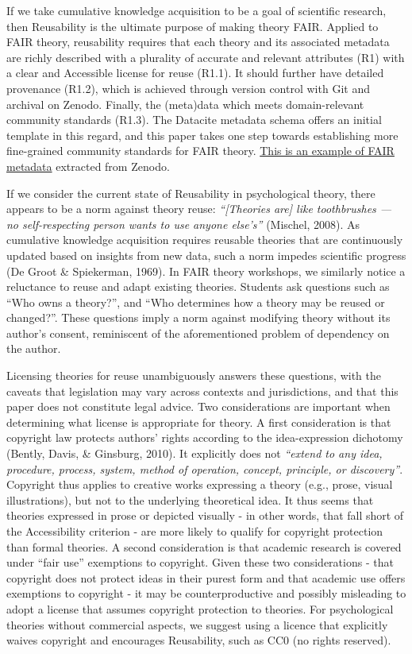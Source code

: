 \documentclass[
  man, noextraspace,floatsintext]{apa6}
\begin{document}
If we take cumulative knowledge acquisition to be a goal of scientific research, then Reusability is the ultimate purpose of making theory FAIR.
Applied to FAIR theory, reusability requires that each theory and its associated metadata are richly described with a plurality of accurate and relevant attributes (R1) with a clear and Accessible license for reuse (R1.1).
It should further have detailed provenance (R1.2),
which is achieved through version control with Git and archival on Zenodo.
Finally, the (meta)data which meets domain-relevant community standards (R1.3).
The Datacite metadata schema offers an initial template in this regard,
and this paper takes one step towards establishing more fine-grained community standards for FAIR theory.
\href{https://raw.githubusercontent.com/cjvanlissa/fair_theory/refs/heads/main/example_metadata.json}{This is an example of FAIR metadata} extracted from Zenodo.

If we consider the current state of Reusability in psychological theory, there appears to be a norm against theory reuse:
\emph{``{[}Theories are{]} like toothbrushes --- no self-respecting person wants to use anyone else's''} (Mischel, 2008).
As cumulative knowledge acquisition requires reusable theories that are continuously updated based on insights from new data, such a norm impedes scientific progress (De Groot \& Spiekerman, 1969).
In FAIR theory workshops, we similarly notice a reluctance to reuse and adapt existing theories.
Students ask questions such as ``Who owns a theory?'',
and ``Who determines how a theory may be reused or changed?''.
These questions imply a norm against modifying theory without its author's consent, reminiscent of the aforementioned problem of dependency on the author.

Licensing theories for reuse unambiguously answers these questions,
with the caveats that legislation may vary across contexts and jurisdictions, and that this paper does not constitute legal advice.
Two considerations are important when determining what license is appropriate for theory.
A first consideration is that copyright law protects authors' rights according to the idea-expression dichotomy (Bently, Davis, \& Ginsburg, 2010).
It explicitly does not
\emph{``extend to any idea, procedure, process, system, method of operation, concept, principle, or discovery''}.
Copyright thus applies to creative works expressing a theory (e.g., prose, visual illustrations),
but not to the underlying theoretical idea.
It thus seems that theories expressed in prose or depicted visually - in other words, that fall short of the Accessibility criterion - are more likely to qualify for copyright protection than formal theories.
A second consideration is that academic research is covered under ``fair use'' exemptions to copyright.
Given these two considerations - that copyright does not protect ideas in their purest form and that academic use offers exemptions to copyright - it may be counterproductive and possibly misleading to adopt a license that assumes copyright protection to theories.
For psychological theories without commercial aspects, we suggest using a licence that explicitly waives copyright and encourages Reusability,
such as CC0 (no rights reserved).
\end{document}

